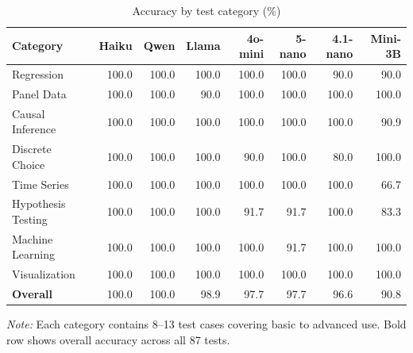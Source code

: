\begin{table}[htbp]
\centering
\begin{threeparttable}
\small
\caption{Accuracy by test category (\%)}
\label{tab:category-accuracy}
\begin{tabular}{lrrrrrrr}
  \toprule
Category & Haiku & Qwen & Llama & 4o-mini & 5-nano & 4.1-nano & Mini-3B \\
  \midrule
Regression & 100.0 & 100.0 & 100.0 & 100.0 & 100.0 & 90.0 & 90.0 \\
Panel Data & 100.0 & 100.0 & 90.0 & 100.0 & 100.0 & 100.0 & 100.0 \\
Causal Inference & 100.0 & 100.0 & 100.0 & 100.0 & 100.0 & 100.0 & 90.9 \\
Discrete Choice & 100.0 & 100.0 & 100.0 & 90.0 & 100.0 & 80.0 & 100.0 \\
Time Series & 100.0 & 100.0 & 100.0 & 100.0 & 100.0 & 100.0 & 66.7 \\
Hypothesis Testing & 100.0 & 100.0 & 100.0 & 91.7 & 91.7 & 100.0 & 83.3 \\
Machine Learning & 100.0 & 100.0 & 100.0 & 100.0 & 91.7 & 100.0 & 100.0 \\
Visualization & 100.0 & 100.0 & 100.0 & 100.0 & 100.0 & 100.0 & 100.0 \\
  \midrule
\textbf{Overall} & 100.0 & 100.0 & 98.9 & 97.7 & 97.7 & 96.6 & 90.8 \\
  \bottomrule
\end{tabular}
\begin{tablenotes}[flushleft]
\item \emph{Note:} Each category contains 8--13 test cases covering
basic to advanced use. Bold row shows overall accuracy across all 87
tests.
\end{tablenotes}
\end{threeparttable}
\end{table}
